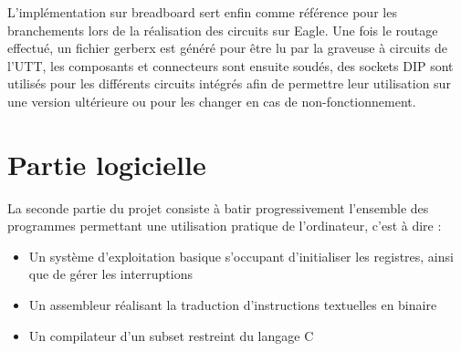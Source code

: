 \documentclass{article}
\begin{document}
    L'implémentation sur breadboard sert enfin comme référence pour les branchements
   lors de la réalisation des circuits sur Eagle.
   Une fois le routage effectué, un fichier gerberx est généré pour être lu par la graveuse à circuits
   de l'UTT, les composants et connecteurs sont ensuite soudés, des sockets DIP sont utilisés pour les 
   différents circuits intégrés afin de permettre leur utilisation sur une version ultérieure ou pour les
   changer en cas de non-fonctionnement.

   \newpage


   \section{Partie logicielle}

   La seconde partie du projet consiste à batir progressivement l'ensemble des programmes permettant
   une utilisation pratique de l'ordinateur, c'est à dire : \\

   \begin{itemize}
       \item Un système d'exploitation basique s'occupant d'initialiser les registres,
       ainsi que de gérer les interruptions
       \item Un assembleur réalisant la traduction d'instructions textuelles en binaire
       \item Un compilateur d'un subset restreint du langage C
   \end{itemize} 
\end{document}
